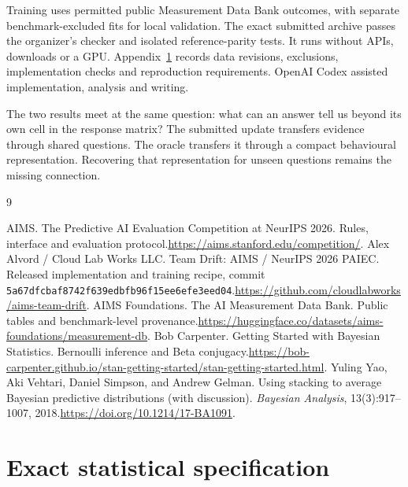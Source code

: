 \documentclass{article}
\begin{document}
Training uses permitted public Measurement Data Bank outcomes, with separate benchmark-excluded fits for local validation. The exact submitted archive passes the organizer's checker and isolated reference-parity tests. It runs without APIs, downloads or a GPU. Appendix~\ref{app:details} records data revisions, exclusions, implementation checks and reproduction requirements. OpenAI Codex assisted implementation, analysis and writing.

The two results meet at the same question: what can an answer tell us beyond its own cell in the response matrix? The submitted update transfers evidence through shared questions. The oracle transfers it through a compact behavioural representation. Recovering that representation for unseen questions remains the missing connection.

\clearpage
\begin{thebibliography}{9}\raggedright{}
 AIMS. The Predictive AI Evaluation Competition at NeurIPS 2026. Rules, interface and evaluation protocol.\newline\url{https://aims.stanford.edu/competition/}.
 Alex Alvord / Cloud Lab Works LLC. Team Drift: AIMS / NeurIPS 2026 PAIEC. Released implementation and training recipe, commit \texttt{5a67dfcbaf8742f639edbfb96f15ee6efe3eed04}.\newline\url{https://github.com/cloudlabworks/aims-team-drift}.
 AIMS Foundations. The AI Measurement Data Bank. Public tables and benchmark-level provenance.\newline\url{https://huggingface.co/datasets/aims-foundations/measurement-db}.
 Bob Carpenter. Getting Started with Bayesian Statistics. Bernoulli inference and Beta conjugacy.\newline\url{https://bob-carpenter.github.io/stan-getting-started/stan-getting-started.html}.
 Yuling Yao, Aki Vehtari, Daniel Simpson, and Andrew Gelman. Using stacking to average Bayesian predictive distributions (with discussion). \emph{Bayesian Analysis}, 13(3):917--1007, 2018.\newline\url{https://doi.org/10.1214/17-BA1091}.
\end{thebibliography}

\clearpage
\appendix
\section{Exact statistical specification}\label{app:details}
\end{document}

